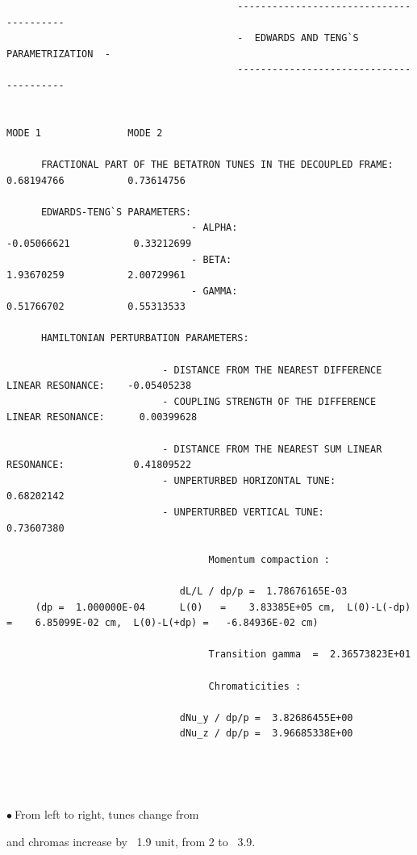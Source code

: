 \documentclass[10pt]{article}
\newcommand{\nib}{\noindent \ensuremath{\bullet~}}
\newcommand{\blue}{\color{blue}}
\begin{document}
\begin{minipage}{1.\linewidth}
\begin{minipage}{.49\linewidth}
\begin{verbatim}
                                        ----------------------------------------
                                        -  EDWARDS AND TENG`S PARAMETRIZATION  -
                                        ----------------------------------------

                                                                              MODE 1               MODE 2

      FRACTIONAL PART OF THE BETATRON TUNES IN THE DECOUPLED FRAME:        0.68194766           0.73614756

      EDWARDS-TENG`S PARAMETERS:
                                - ALPHA:                                   -0.05066621           0.33212699
                                - BETA:                                     1.93670259           2.00729961
                                - GAMMA:                                    0.51766702           0.55313533

      HAMILTONIAN PERTURBATION PARAMETERS:

                           - DISTANCE FROM THE NEAREST DIFFERENCE LINEAR RESONANCE:    -0.05405238
                           - COUPLING STRENGTH OF THE DIFFERENCE LINEAR RESONANCE:      0.00399628

                           - DISTANCE FROM THE NEAREST SUM LINEAR RESONANCE:            0.41809522
                           - UNPERTURBED HORIZONTAL TUNE:                               0.68202142
                           - UNPERTURBED VERTICAL TUNE:                                 0.73607380

                                   Momentum compaction : 

                              dL/L / dp/p =  1.78676165E-03
     (dp =  1.000000E-04      L(0)   =    3.83385E+05 cm,  L(0)-L(-dp) =    6.85099E-02 cm,  L(0)-L(+dp) =   -6.84936E-02 cm) 

                                   Transition gamma  =  2.36573823E+01

                                   Chromaticities : 

                              dNu_y / dp/p =  3.82686455E+00
                              dNu_z / dp/p =  3.96685338E+00
\end{verbatim}

\end{minipage}

~

~

\nib From left to right, tunes change from 

{\blue 
{}
}

and chromas increase by ~1.9 unit, from 2 to ~3.9.



\end{minipage}
\end{document}
